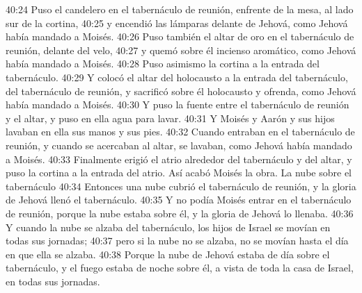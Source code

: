 40:24 Puso el candelero en el tabernáculo de reunión, enfrente de la mesa, al lado sur de la cortina, 
40:25 y encendió las lámparas delante de Jehová, como Jehová había mandado a Moisés. 
40:26 Puso también el altar de oro en el tabernáculo de reunión, delante del velo, 
40:27 y quemó sobre él incienso aromático, como Jehová había mandado a Moisés. 
40:28 Puso asimismo la cortina a la entrada del tabernáculo. 
40:29 Y colocó el altar del holocausto a la entrada del tabernáculo, del tabernáculo de reunión, y sacrificó sobre él holocausto y ofrenda, como Jehová había mandado a Moisés. 
40:30 Y puso la fuente entre el tabernáculo de reunión y el altar, y puso en ella agua para lavar. 
40:31 Y Moisés y Aarón y sus hijos lavaban en ella sus manos y sus pies. 
40:32 Cuando entraban en el tabernáculo de reunión, y cuando se acercaban al altar, se lavaban, como Jehová había mandado a Moisés. 
40:33 Finalmente erigió el atrio alrededor del tabernáculo y del altar, y puso la cortina a la entrada del atrio. Así acabó Moisés la obra. 
La nube sobre el tabernáculo 
40:34 Entonces una nube cubrió el tabernáculo de reunión, y la gloria de Jehová llenó el tabernáculo. 
40:35 Y no podía Moisés entrar en el tabernáculo de reunión, porque la nube estaba sobre él, y la gloria de Jehová lo llenaba. 
40:36 Y cuando la nube se alzaba del tabernáculo, los hijos de Israel se movían en todas sus jornadas; 
40:37 pero si la nube no se alzaba, no se movían hasta el día en que ella se alzaba. 
40:38 Porque la nube de Jehová estaba de día sobre el tabernáculo, y el fuego estaba de noche sobre él, a vista de toda la casa de Israel, en todas sus jornadas.